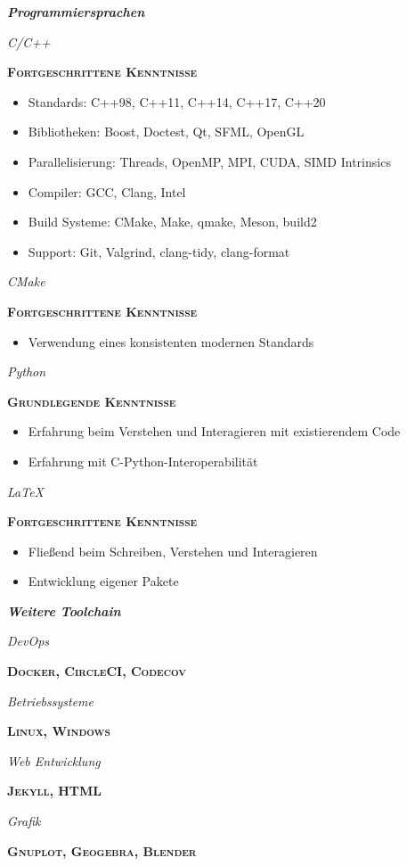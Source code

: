 \documentclass[8pt]{article}
\newcommand{\cvSubsectionStyle}{%
  \normalfont%
  \sffamily%
  \itshape%
  \bfseries%
}
\newcommand{\cvSubsection}[1]{%
  \begin{tcolorbox}[left=0pt, top=0pt, bottom=0pt, right=0pt, boxsep=5pt, arc=5pt, frame code={}, colback=cvBackgroundColor]
    \cvSubsectionStyle #1%
  \end{tcolorbox}
}
\newenvironment{cvItemize}{%
  \begin{itemize}[itemsep=0mm, leftmargin=4mm]
}{%
  \end{itemize}
}
\newenvironment{cvSkillItem}[2]{
  \par
  \begin{minipage}[c]{0.2\linewidth}
    \raggedleft
    \normalfont
    \sffamily
    \itshape
    #1
  \end{minipage}
  \hspace{0.02\linewidth}
  \vrule
  \hspace{0.02\linewidth}
  \begin{minipage}[t]{0.74\linewidth}
    \sffamily\textsc{\color{cvColor} \textbf{#2}}\par
      \normalfont\footnotesize\sffamily
}{
  \end{minipage}
  \par%
  \vspace{\baselineskip}%
}
\begin{document}
  \cvSubsection{Programmiersprachen}
  \vspace{-1.8em}
  \begin{multicols}{2}
  \begin{cvSkillItem}{C/C++}{Fortgeschrittene Kenntnisse}
    \begin{cvItemize}
      \item Standards: C++98, C++11, C++14, C++17, C++20
      \item Bibliotheken: Boost, Doctest, Qt, SFML, OpenGL
      \item Parallelisierung: Threads, OpenMP, MPI, CUDA, SIMD Intrinsics
      \item Compiler: GCC, Clang, Intel
      \item Build Systeme: CMake, Make, qmake, Meson, build2
      \item Support: Git, Valgrind, clang-tidy, clang-format
    \end{cvItemize}
  \end{cvSkillItem}
  \begin{cvSkillItem}{CMake}{Fortgeschrittene Kenntnisse}
    \begin{cvItemize}
      \item Verwendung eines konsistenten modernen Standards
    \end{cvItemize}
  \end{cvSkillItem}
  \begin{cvSkillItem}{Python}{Grundlegende Kenntnisse}
    \begin{cvItemize}
      \item Erfahrung beim Verstehen und Interagieren mit existierendem Code
      \item Erfahrung mit C-Python-Interoperabilität
    \end{cvItemize}
  \end{cvSkillItem}
  \begin{cvSkillItem}{LaTeX}{Fortgeschrittene Kenntnisse}
    \begin{cvItemize}
      \item Fließend beim Schreiben, Verstehen und Interagieren
      \item Entwicklung eigener Pakete
    \end{cvItemize}
  \end{cvSkillItem}
  \end{multicols}

  \cvSubsection{Weitere Toolchain}
  \vspace{-1.8em}
  \begin{multicols}{2}
  \begin{cvSkillItem}{DevOps}{Docker, CircleCI, Codecov}
  \end{cvSkillItem}
  \begin{cvSkillItem}{Betriebs\-systeme}{Linux, Windows}
  \end{cvSkillItem}
  \begin{cvSkillItem}{Web Entwicklung}{Jekyll, HTML}
  \end{cvSkillItem}
  \begin{cvSkillItem}{Grafik}{Gnuplot, Geogebra, Blender}
  \end{cvSkillItem}
  \end{multicols}
\end{document}
